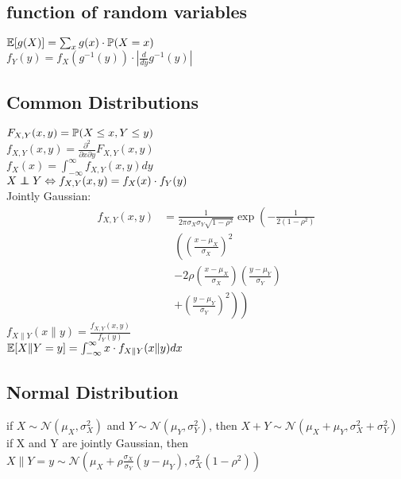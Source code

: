 \subsection{function of random variables}
$\mathbb{E}[g(X)] = \sum_{x} g(x) \cdot \mathbb{P}(X = x)$\\
$f_Y(y) = f_X(g^{-1}(y)) \cdot \left| \frac{d}{dy} g^{-1}(y) \right|$\\
\subsection{Common Distributions}
$F_{X,Y}(x, y) = \mathbb{P}(X \leq x, Y \leq y)$\\
$f_{X,Y}(x, y) = \frac{\partial^2}{\partial x \partial y} F_{X,Y}(x, y)$\\
$f_X(x) = \int_{-\infty}^{\infty} f_{X,Y}(x, y) dy$\\
$X \perp\!\!\!\!\perp Y \Leftrightarrow f_{X,Y}(x, y) = f_X(x) \cdot f_Y(y)$\\
Jointly Gaussian:
\begin{align*}
        f_{X,Y}(x, y) &= \frac{1}{2\pi \sigma_X \sigma_Y \sqrt{1 - \rho^2}} \exp\left(-\frac{1}{2(1 - \rho^2)} \right. \\
        &\quad \left. \left( \left(\frac{x - \mu_X}{\sigma_X}\right)^2 \right. \right. \\
        &\quad \left. \left. - 2\rho\left(\frac{x - \mu_X}{\sigma_X}\right)\left(\frac{y - \mu_Y}{\sigma_Y}\right) \right. \right. \\
        &\quad \left. \left. + \left(\frac{y - \mu_Y}{\sigma_Y}\right)^2 \right) \right)
\end{align*}
$f_{X \| Y}(x \| y) = \frac{f_{X,Y}(x, y)}{f_Y(y)}$\\
$\mathbb{E}[X \| Y = y] = \int_{-\infty}^{\infty} x \cdot f_{X \| Y}(x \| y) dx$\\
\subsection{Normal Distribution}
if $X \sim \mathcal{N}(\mu_X, \sigma_X^2)$ and $Y \sim \mathcal{N}(\mu_Y, \sigma_Y^2)$, then $X + Y \sim \mathcal{N}(\mu_X + \mu_Y, \sigma_X^2 + \sigma_Y^2)$\\
if X and Y are jointly Gaussian, then $X \| Y = y \sim \mathcal{N}(\mu_X + \rho \frac{\sigma_X}{\sigma_Y}(y - \mu_Y), \sigma_X^2(1 - \rho^2))$\\
